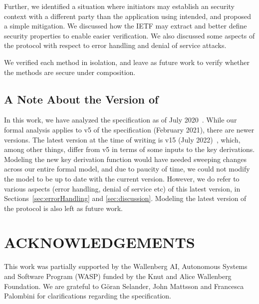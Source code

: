 \documentclass[runningheads]{llncs}
\newcommand{\mProtocolStyle}[1]{\text{#1}}
\newcommand{\mSpec}{specification}  %
\newcommand{\mTamarin}{\mProtocolStyle{Tamarin}}
\newcommand{\mEdhoc}{\mProtocolStyle{EDHOC}}
\newcommand{\mOscore}{\mProtocolStyle{OSCORE}}
\begin{document}
Further, we identified a situation where initiators may establish an \mOscore{}
security context with a different party than the application using \mEdhoc{}
intended, and proposed a simple mitigation.
%
We discussed how the IETF may extract and better define security properties
to enable easier verification.
%
We also discussed some aspects of the protocol with respect to error handling
and denial of service attacks.
%

We verified each method in isolation, and leave as future work to verify whether
the methods are secure under composition.

\subsection{A Note About the Version of \mEdhoc}
\label{sec:newdrafts}
In this work, we have analyzed the \mEdhoc{} specification as of July
2020~\cite{our-analysis-selander-lake-edhoc-00}.
%
While our formal analysis applies to v5 of the \mSpec{} (February 2021),
there are newer versions.
%
The latest version at the time of writing is
v15 (July 2022)~\cite{draft-ietf-lake-edhoc-15}, which, among other things,
differ from v5 in terms of some inputs to the key derivations.
%
Modeling the new key derivation function would have needed sweeping changes
across our entire formal model, and due to paucity of time, we could not modify
the \mTamarin{} model to be up to date with the current version.
%
However, we do refer to various aspects
(error handling, denial of service etc) of this latest version,
in Sections~\ref{sec:errorHandling} and \ref{sec:discussion}.
%
Modeling the latest version of the protocol is also left as future work.
%

\section*{ACKNOWLEDGEMENTS}
This work was partially supported by
the Wallenberg AI, Autonomous Systems and Software Program (WASP) 
funded by
the Knut and Alice Wallenberg Foundation.
%
We are grateful to G\"oran Selander, John Mattsson and Francesca Palombini 
for
clarifications regarding the specification.
%


{\small
    
}
\end{document}
